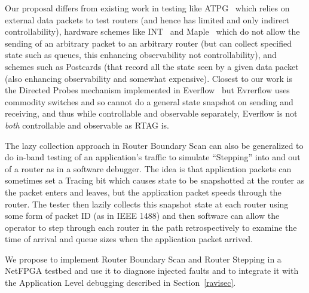  Our proposal differs from existing work in testing like ATPG~\cite{atpg} which relies on external data packets to test routers (and hence
 has limited and only indirect controllability), hardware schemes like INT~\cite{int} and Maple~\cite{maple} which do not allow the sending of an arbitrary packet
 to an arbitrary router (but can collect specified state such as queues, this enhancing observability not controllability), and schemes such
 as Postcards (that record all the state seen by a given data packet (also enhancing observability and somewhat expensive).  Closest to our
 work is the Directed Probes mechanism implemented in Everflow~\cite{everflow} but Evrerflow uses commodity switches and so 
 cannot do a general state snapshot on sending and receiving, and thus while controllable and observable separately, Everflow 
 is not {\em both} controllable and observable as RTAG is.

The lazy collection approach in Router Boundary Scan can also be generalized to do in-band testing of an application's traffic to simulate ``Stepping''
into and out of a router as in a software debugger.  The idea is that application packets can sometimes set a Tracing bit which causes state to
be snapshotted at the router as the packet enters and leaves, but the application packet speeds through the router.  The tester then lazily collects this
snapshot state at each router using some form of packet ID (as in IEEE 1488) and then software can allow the operator to step through each router
in the path retrospectively to examine the time of arrival and queue sizes when the application packet arrived.

We propose to implement Router Boundary Scan and Router Stepping in a NetFPGA testbed and use it to diagnose injected faults and to integrate
it with the Application Level debugging described in Section~\ref{ravisec}.
 
 
 
 
